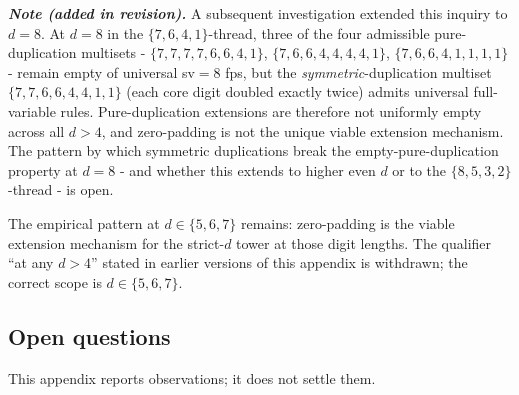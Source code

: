 \documentclass[11pt,letterpaper]{article}
\theoremstyle{paperstyle}
\theoremstyle{paperstyledef}
\theoremstyle{paperstylerem}
\begin{document}
\textbf{\emph{Note (added in revision).}} A subsequent investigation
extended this inquiry to \(d = 8\). At \(d = 8\) in the
\(\{7, 6, 4, 1\}\)-thread, three of the four admissible pure-duplication
multisets - \(\{7,7,7,7,6,6,4,1\}\), \(\{7,6,6,4,4,4,4,1\}\),
\(\{7,6,6,4,1,1,1,1\}\) - remain empty of universal sv\(= 8\) fps, but
the \emph{symmetric}-duplication multiset \(\{7,7,6,6,4,4,1,1\}\) (each
core digit doubled exactly twice) admits universal full-variable rules.
Pure-duplication extensions are therefore not uniformly empty across all
\(d > 4\), and zero-padding is not the unique viable extension
mechanism. The pattern by which symmetric duplications break the
empty-pure-duplication property at \(d = 8\) - and whether this
extends to higher even \(d\) or to the \(\{8, 5, 3, 2\}\)-thread - is
open.

The empirical pattern at \(d \in \{5, 6, 7\}\) remains: zero-padding is
the viable extension mechanism for the strict-\(d\) tower at those digit
lengths. The qualifier ``at any \(d > 4\)'' stated in earlier versions
of this appendix is withdrawn; the correct scope is
\(d \in \{5, 6, 7\}\).

\hypertarget{f.6-open-questions}{%
\subsection{Open questions}\label{f.6-open-questions}}

This appendix reports observations; it does not settle them.
\end{document}
